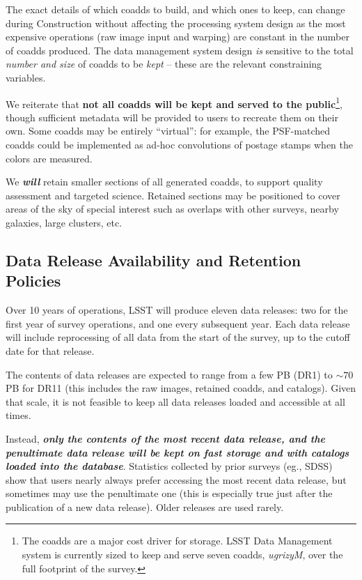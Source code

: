 \documentclass[12pt]{article}
\newcommand{\req}[1]{\marginpar{\tiny #1}}
\newcommand{\dmreq}[1]{\req{DMS-REQ-#1}}
\begin{document}
The exact details of which coadds to build, and which ones to keep, can change during Construction without affecting the processing system design as the most expensive operations (raw image input and warping) are constant in the number of coadds produced. The data management system design \emph{is} sensitive to the total \emph{number and size} of coadds to be \emph{kept} -- these are the relevant constraining variables.

We reiterate that \textbf{not all coadds will be kept and served to the public}\footnote{The coadds are a major cost driver for storage. LSST Data Management system is currently sized to keep and serve seven coadds, \emph{ugrizyM}, over the full footprint of the survey.}, though sufficient metadata will be provided to users to recreate them on their own. Some coadds may be entirely ``virtual'': for example, the PSF-matched coadds could be implemented as ad-hoc convolutions of postage stamps when the colors are measured.\dmreq{0311}

We \emph\textbf{will} retain smaller sections of all generated coadds, to support quality assessment and targeted science.\dmreq{0338} Retained sections may be positioned to cover areas of the sky of special interest such as overlaps with other surveys, nearby galaxies, large clusters, etc.

\subsection{Data Release Availability and Retention Policies}
\label{sec:retention}

Over 10 years of operations, LSST will produce eleven data releases: two for the first year of survey operations, and one every subsequent year. Each data release will include reprocessing of all data from the start of the survey, up to the cutoff date for that release.

The contents of data releases are expected to range from a few PB (DR1) to $\sim 70$ PB for DR11 (this includes the raw images, retained coadds, and catalogs). Given that scale, it is not feasible to keep all data releases loaded and accessible at all times.

Instead, \textbf{\emph{only the contents of the most recent data release, and the penultimate data release will be kept on fast storage and with catalogs loaded into the database}}. \dmreq{0313} Statistics collected by prior surveys (eg., SDSS) show that users nearly always prefer accessing the most recent data release, but sometimes may use the penultimate one (this is especially true just after the publication of a new data release). Older releases are used rarely.
\end{document}
